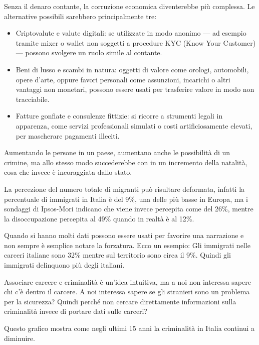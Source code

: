 \documentclass[12pt]{book} %
\begin{document}
\begin{mdframed}[linewidth=1pt]
Senza il denaro contante, la corruzione economica diventerebbe più complessa. Le alternative possibili sarebbero principalmente tre:

\begin{itemize}
\item Criptovalute e valute digitali: se utilizzate in modo anonimo — ad esempio tramite mixer o wallet non soggetti a procedure KYC (Know Your Customer) — possono svolgere un ruolo simile al contante.
\item Beni di lusso e scambi in natura: oggetti di valore come orologi, automobili, opere d’arte, oppure favori personali come assunzioni, incarichi o altri vantaggi non monetari, possono essere usati per trasferire valore in modo non tracciabile.
\item Fatture gonfiate e consulenze fittizie: si ricorre a strumenti legali in apparenza, come servizi professionali simulati o costi artificiosamente elevati, per mascherare pagamenti illeciti.
\end{itemize}
\end{mdframed}

Aumentando le persone
in un paese, aumentano anche le possibilità di un crimine, ma allo stesso modo succederebbe con in un incremento della
natalità, cosa che invece è incoraggiata dallo stato.

La percezione del numero totale di migranti può risultare deformata, infatti la percentuale di immigrati in Italia è del 9\%, una delle più basse in Europa, ma i sondaggi di Ipsos-Mori indicano che viene invece percepita come del 26\%, mentre la disoccupazione percepita al 49\% quando
in realtà è al 12\%.

Quando si hanno molti dati possono essere usati per favorire una narrazione e non sempre è semplice notare la forzatura.
Ecco un esempio: Gli immigrati nelle carceri italiane sono 32\% mentre sul territorio sono circa il 9\%. Quindi gli immigrati delinquono più degli italiani.

Associare carcere e criminalità è un'idea intuitiva, ma a noi non interessa sapere chi c'è dentro il carcere. A noi interessa sapere se gli stranieri sono un problema per la sicurezza? Quindi perché non cercare direttamente informazioni sulla criminalità invece di portare dati sulle carceri?

Questo grafico mostra come negli ultimi 15 anni la criminalità in Italia continui a diminuire.
\end{document}
